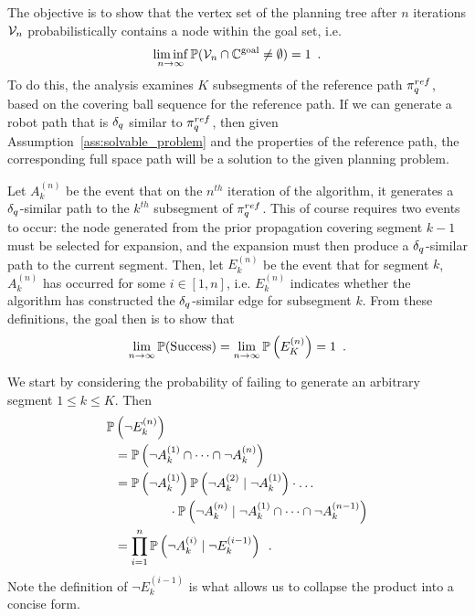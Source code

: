 The objective is to show that the vertex set of the planning tree after $n$ iterations $\mathcal{V}_n$ probabilistically contains a node within the goal set, i.e.
\begin{equation}
    \liminf_{n \rightarrow \infty} \mathbb{P}( \mathcal{V}_n \cap \mathbb{C}^\textrm{goal} \neq \emptyset ) = 1 \enspace .
\end{equation}
To do this, the analysis examines $K$ subsegments of the reference path $\pi_{q}^{ref}$, based on the covering ball sequence for the reference path. If we can generate a robot path that is $\delta_q$ similar to $\pi_{q}^{ref}$, then given Assumption~\ref{ass:solvable_problem} and the properties of the reference path, the corresponding full space path will be a solution to the given planning problem.

Let $A_k^{(n)}$ be the event that on the $n^{th}$ iteration of the algorithm, it generates a $\delta_q$-similar path to the $k^{th}$ subsegment of $\pi_{q}^{ref}$.  This of course requires two events to occur: the node generated from the prior propagation covering segment $k-1$ must be selected for expansion, and the expansion must then produce a $\delta_q$-similar path to the current segment.  Then, let $E_k^{(n)}$ be the event that for segment $k$, $A_k^{(n)}$ has occurred for some $i \in [1,n]$, i.e. $E_k^{(n)}$ indicates whether the algorithm has constructed the $\delta_q$-similar edge for subsegment $k$. From these definitions, the goal then is to show that
\begin{equation}
    \lim_{n \rightarrow \infty} \mathbb{P}(\textrm{Success}) = \lim_{n \rightarrow \infty} \mathbb{P}\left( E^{(n)}_K \right) = 1 \enspace.
    \label{eqn:initial_pr_limit}
\end{equation}

We start by considering the probability of failing to generate an arbitrary segment $1 \leq k \leq K$. Then 
\begin{equation}
\begin{split}
    \mathbb{P}&\left( \neg E^{(n)}_k \right) \\
       &= \mathbb{P}\left( \neg A^{(1)}_k \cap \dots \cap \neg A^{(n)}_k \right) \\
       &= \mathbb{P}\left( \neg A^{(1)}_k \right) \mathbb{P}\left( \neg A^{(2)}_k \mid \neg A^{(1)}_k \right) \cdot \dots \\
       &\hspace{1.5cm} \cdot \mathbb{P}\left( \neg A^{(n)}_k \mid \neg A^{(1)}_k \cap \dots \cap \neg A^{(n-1)}_k \right) \\
       &= \prod_{i=1}^n \mathbb{P}\left( \neg A^{(i)}_k \mid \neg E^{(i-1)}_k \right) \enspace .
\end{split}
\label{eqn:fail_enk}
\end{equation}
Note the definition of $\neg E^{(i-1)}_k$ is what allows us to collapse the product into a concise form.


